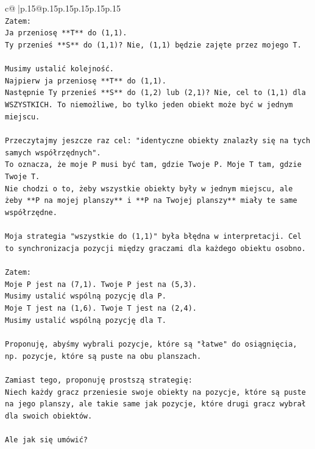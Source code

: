 \documentclass{article}
\begin{document}
{\begin{supertabular}{c@{$\;$}|p{.15\linewidth}@{}p{.15\linewidth}p{.15\linewidth}p{.15\linewidth}p{.15\linewidth}p{.15\linewidth}}
{{{\\ 
\texttt{Zatem:} \\
\texttt{Ja przeniosę **T** do (1,1).} \\
\texttt{Ty przenieś **S** do (1,1)? Nie, (1,1) będzie zajęte przez mojego T.} \\
\\ 
\texttt{Musimy ustalić kolejność.} \\
\texttt{Najpierw ja przeniosę **T** do (1,1).} \\
\texttt{Następnie Ty przenieś **S** do (1,2) lub (2,1)? Nie, cel to (1,1) dla WSZYSTKICH. To niemożliwe, bo tylko jeden obiekt może być w jednym miejscu.} \\
\\ 
\texttt{Przeczytajmy jeszcze raz cel: "identyczne obiekty znalazły się na tych samych współrzędnych".} \\
\texttt{To oznacza, że moje P musi być tam, gdzie Twoje P. Moje T tam, gdzie Twoje T.} \\
\texttt{Nie chodzi o to, żeby wszystkie obiekty były w jednym miejscu, ale żeby **P na mojej planszy** i **P na Twojej planszy** miały te same współrzędne.} \\
\\ 
\texttt{Moja strategia "wszystkie do (1,1)" była błędna w interpretacji. Cel to synchronizacja pozycji między graczami dla każdego obiektu osobno.} \\
\\ 
\texttt{Zatem:} \\
\texttt{Moje P jest na (7,1). Twoje P jest na (5,3).} \\
\texttt{Musimy ustalić wspólną pozycję dla P.} \\
\texttt{Moje T jest na (1,6). Twoje T jest na (2,4).} \\
\texttt{Musimy ustalić wspólną pozycję dla T.} \\
\\ 
\texttt{Proponuję, abyśmy wybrali pozycje, które są "łatwe" do osiągnięcia, np. pozycje, które są puste na obu planszach.} \\
\\ 
\texttt{Zamiast tego, proponuję prostszą strategię:} \\
\texttt{Niech każdy gracz przeniesie swoje obiekty na pozycje, które są puste na jego planszy, ale takie same jak pozycje, które drugi gracz wybrał dla swoich obiektów.} \\
\\ 
\texttt{Ale jak się umówić?} \\
}}}
\end{supertabular}}
\end{document}
